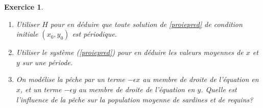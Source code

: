 \documentclass[11pt]{article}
\newcommand{\R}{\ensuremath{\mathbb R}}
\theoremstyle{exostyle}
\newtheorem{exercice}{Exercice}
\begin{document}
\begin{exercice}
\begin{enumerate}
délimitées par les isoclines.
\item Utiliser $H$ pour en déduire que toute solution de  \eqref{proiepred} de condition initiale $(x_0 , y_0 )$  est périodique.
  \item Utiliser le système (\ref{proiepred}) pour en déduire les valeurs moyennes de $x$ et $y$ sur une période.
 \item On modélise la pêche par un terme $-\epsilon x$ au membre de droite de l'équation en $x$, et un terme $-\epsilon y$ au membre de droite de l'équation en $y$. Quelle est l’influence de la pêche sur la population moyenne de sardines et de requins? 
\end{enumerate}
\end{exercice}
\medskip
\end{document}
